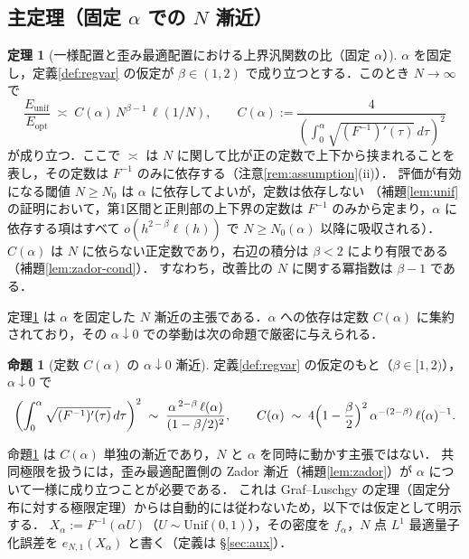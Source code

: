 \documentclass[a4paper,10pt]{jsarticle}
\theoremstyle{definition}
\newtheorem{proposition}{命題}[section]
\newtheorem{theorem}{定理}[section]
\newcommand{\Finv}{F^{-1}}
\newcommand{\eN}{e_{N,1}}
\newcommand{\Eunif}{E_{\mathrm{unif}}}
\newcommand{\Eopt}{E_{\mathrm{opt}}}
\begin{document}
\subsection{主定理（固定 $\alpha$ での $N$ 漸近）}

\begin{theorem}[一様配置と歪み最適配置における上界汎関数の比（固定 $\alpha$）]
\label{thm:alpha}
$\alpha$ を固定し，定義\ref{def:regvar} の仮定が $\beta\in(1,2)$ で成り立つとする．このとき $N\to\infty$ で
\begin{equation}
  \frac{\Eunif}{\Eopt}
  \;\asymp\;C(\alpha)\,N^{\beta-1}\,\ell(1/N),
  \qquad
  C(\alpha):=\frac{4}{\left(\int_0^\alpha\sqrt{(\Finv)'(\tau)}\,d\tau\right)^{2}}
  \label{eq:thm-scaling}
\end{equation}
が成り立つ．ここで $\asymp$ は $N$ に関して比が正の定数で上下から挟まれることを表し，その定数は $\Finv$ のみに依存する（注意\ref{rem:assumption}(ii)）．
評価が有効になる閾値 $N\ge N_0$ は $\alpha$ に依存してよいが，定数は依存しない
（補題\ref{lem:unif} の証明において，第1区間と正則部の上下界の定数は $\Finv$ のみから定まり，$\alpha$ に依存する項はすべて $o(h^{2-\beta}\ell(h))$ で $N\ge N_0(\alpha)$ 以降に吸収される）．
$C(\alpha)$ は $N$ に依らない正定数であり，右辺の積分は $\beta<2$ により有限である（補題\ref{lem:zador-cond}）．
すなわち，改善比の $N$ に関する冪指数は $\beta-1$ である．
\end{theorem}

定理\ref{thm:alpha} は $\alpha$ を固定した $N$ 漸近の主張である．$\alpha$ への依存は定数 $C(\alpha)$ に集約されており，その $\alpha\downarrow0$ での挙動は次の命題で厳密に与えられる．

\begin{proposition}[定数 $C(\alpha)$ の $\alpha\downarrow0$ 漸近]
\label{prop:alpha}
定義\ref{def:regvar} の仮定のもと（$\beta\in[1,2)$），$\alpha\downarrow0$ で
\begin{equation}
  \left(\int_0^\alpha\sqrt{(\Finv)'(\tau)}\,d\tau\right)^{2}
  \;\sim\;\frac{\alpha^{\,2-\beta}\,\ell(\alpha)}{(1-\beta/2)^{2}},
  \qquad
  C(\alpha)\;\sim\;4\Bigl(1-\frac\beta2\Bigr)^{2}\,\alpha^{-(2-\beta)}\,\ell(\alpha)^{-1}.
  \label{eq:alpha-scaling}
\end{equation}
\end{proposition}

命題\ref{prop:alpha} は $C(\alpha)$ 単独の漸近であり，$N$ と $\alpha$ を同時に動かす主張ではない．
共同極限を扱うには，歪み最適配置側の Zador 漸近（補題\ref{lem:zador}）が $\alpha$ について一様に成り立つことが必要である．
これは Graf--Luschgy の定理（固定分布に対する極限定理）からは自動的には従わないため，以下では仮定として明示する．
$X_\alpha:=\Finv(\alpha U)$（$U\sim\mathrm{Unif}(0,1)$），その密度を $f_\alpha$，$N$ 点 $L^1$ 最適量子化誤差を $\eN(X_\alpha)$ と書く（定義は §\ref{sec:aux}）．
\end{document}
